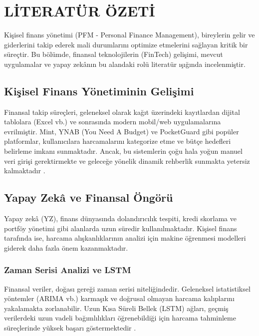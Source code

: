 \chapter{LİTERATÜR ÖZETİ}\label{ch:literatur}
\vspace*{-1cm}

Kişisel finans yönetimi (PFM - Personal Finance Management), bireylerin gelir ve giderlerini takip ederek mali durumlarını optimize etmelerini sağlayan kritik bir süreçtir. Bu bölümde, finansal teknolojilerin (FinTech) gelişimi, mevcut uygulamalar ve yapay zekânın bu alandaki rolü literatür ışığında incelenmiştir.

\section{Kişisel Finans Yönetiminin Gelişimi}

Finansal takip süreçleri, geleneksel olarak kağıt üzerindeki kayıtlardan dijital tablolara (Excel vb.) ve sonrasında modern mobil/web uygulamalarına evrilmiştir. Mint, YNAB (You Need A Budget) ve PocketGuard gibi popüler platformlar, kullanıcılara harcamalarını kategorize etme ve bütçe hedefleri belirleme imkanı sunmaktadır. Ancak, bu sistemlerin çoğu hala yoğun manuel veri girişi gerektirmekte ve geleceğe yönelik dinamik rehberlik sunmakta yetersiz kalmaktadır \cite{moore91}.

\section{Yapay Zekâ ve Finansal Öngörü}

Yapay zekâ (YZ), finans dünyasında dolandırıcılık tespiti, kredi skorlama ve portföy yönetimi gibi alanlarda uzun süredir kullanılmaktadır. Kişisel finans tarafında ise, harcama alışkanlıklarının analizi için makine öğrenmesi modelleri giderek daha fazla önem kazanmaktadır.

\subsection{Zaman Serisi Analizi ve LSTM}
Finansal veriler, doğası gereği zaman serisi niteliğindedir. Geleneksel istatistiksel yöntemler (ARIMA vb.) karmaşık ve doğrusal olmayan harcama kalıplarını yakalamakta zorlanabilir. Uzun Kısa Süreli Bellek (LSTM) ağları, geçmiş verilerdeki uzun vadeli bağımlılıkları öğrenebildiği için harcama tahminleme süreçlerinde yüksek başarı göstermektedir \cite{Wegener2000629}.

